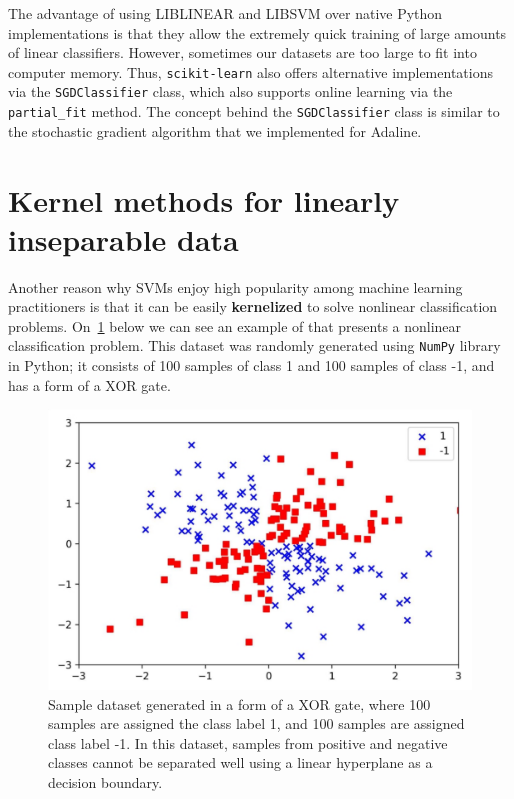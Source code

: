 \documentclass[11pt]{article}
\begin{document}
    The advantage of using LIBLINEAR and LIBSVM over native Python implementations is that they allow the extremely quick training of large amounts of linear classifiers. However, sometimes our datasets are too large to fit into computer memory. Thus, \texttt{scikit-learn} also offers alternative implementations via the \texttt{SGDClassifier} class, which also supports online learning via the \texttt{partial\_fit} method. The concept behind the \texttt{SGDClassifier} class is similar to the stochastic gradient algorithm that we implemented for Adaline.

    \section{Kernel methods for linearly inseparable data} \label{sec:kernel}

    Another reason why SVMs enjoy high popularity among machine learning practitioners is that it can be easily \textbf{kernelized} to solve nonlinear classification problems. On~\ref{fig:non_lin_data} below we can see an example of that presents a nonlinear classification problem. This dataset was randomly generated using \texttt{NumPy} library in Python; it consists of 100 samples of class 1 and 100 samples of class -1, and has a form of a XOR gate.

    \begin{figure}[hbt!]
        \centering
        \includegraphics[width=1\linewidth,trim=4 4 4 4,clip]{svm/img/non_lin_data.png}
        \caption{Sample dataset generated in a form of a XOR gate, where 100 samples are assigned the class label 1, and 100 samples are assigned class label -1. In this dataset, samples from positive and negative classes cannot be separated well using a linear hyperplane as a decision boundary.}
        \label{fig:non_lin_data}
    \end{figure}
\end{document}
